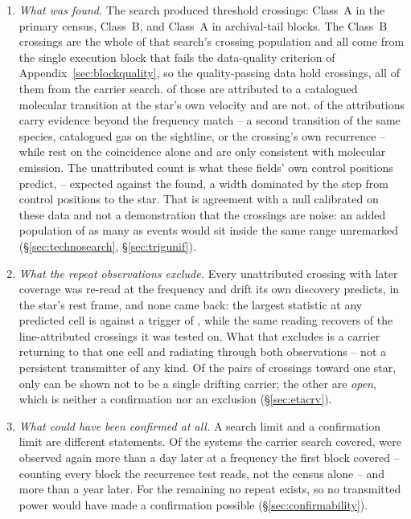 \begin{enumerate}[leftmargin=1.6em,itemsep=4pt,topsep=4pt,parsep=0pt]
\item \emph{What was found.} The search produced \EvNCrossRaw{} threshold
crossings: \CkNCrossCenA{} Class~A in the primary census, \PrFlagXrossWord{}
Class~B, and \CeNTailCrossWord{} Class~A in archival-tail blocks. The
\PrFlagXrossWord{} Class~B crossings are the whole of that search's crossing
population and all come from the single execution block that fails the
data-quality criterion of Appendix~\ref{sec:blockquality}, so the
quality-passing data hold \EvNCrossQp{} crossings, all of them from the
carrier search. \EvNAttrQp{} of those are attributed to
a catalogued molecular transition at the star's own velocity and
\EvNUnattrQp{} are not.
\LnAttrSupp{} of the \EvNAttrQp{} attributions carry evidence beyond the
frequency match -- a second transition of the same species, catalogued gas on
the sightline, or the crossing's own recurrence -- while \LnAttrCoincWord{}
rest on the coincidence alone and are only consistent with molecular
emission. The unattributed count is what these fields' own control positions
predict, \CeLo--\CeHi{} expected against the \CeObs{} found, a width
dominated by the step from control positions to the star. That is agreement
with a null calibrated on these data and not a demonstration that the
crossings are noise: an added population of as many as \CeAddBlind{} events
would sit inside the same range unremarked (\S\ref{sec:technosearch},
\S\ref{sec:trigunif}).

\item \emph{What the repeat observations exclude.} Every unattributed crossing
with later coverage was re-read at the frequency and drift its own discovery
predicts, in the star's rest frame, and none came back: the largest statistic
at any predicted cell is \RcTMax{} against a trigger of \StageNullTrig, while
the same reading recovers \MkAttrRecur{} of the \MkAttrTested{}
line-attributed crossings it was tested on. What
that excludes is a carrier returning to that one cell and radiating through
both observations -- not a persistent transmitter of any kind. Of the
\TjNPair{} pairs of crossings toward one star, only \TjNExcl{} can be shown
not to be a single drifting carrier; the other \TjNOpen{} are \emph{open},
which is neither a confirmation nor an exclusion
(\S\ref{sec:etacrv}).

\item \emph{What could have been confirmed at all.} A search limit and a
confirmation limit are different statements. Of the \NSysClassA{} systems the
carrier search covered, \ZcConfSysDay{} were observed again more than a day later
at a frequency the first block covered -- counting every
block the recurrence test reads, not the census alone -- and \ZcConfSysYr{}
more than a year later. For the remaining \ZcNoRepSys{} no repeat exists, so
no transmitted power would have made a confirmation possible
(\S\ref{sec:confirmability}).


\end{enumerate}
